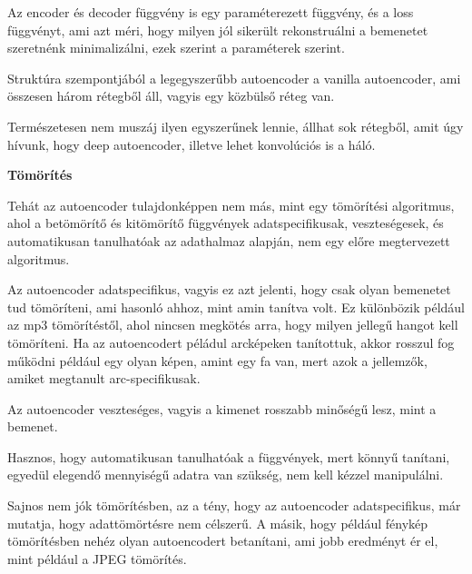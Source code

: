 \documentclass[12pt]{amsart}
\begin{document}
Az encoder és decoder függvény is egy paraméterezett
függvény, és a loss függvényt, ami azt méri, hogy milyen jól
sikerült rekonstruálni a bemenetet szeretnénk minimalizálni,
ezek szerint a paraméterek szerint. 

\vspace{5pt}

Struktúra szempontjából a legegyszerűbb autoencoder a
vanilla autoencoder, ami összesen három rétegből áll, vagyis
egy közbülső réteg van.

\vspace{5pt}

Természetesen nem muszáj ilyen egyszerűnek lennie, állhat
sok rétegből, amit úgy hívunk, hogy deep autoencoder,
illetve lehet konvolúciós is a háló. 

\vspace{10pt}

\textbf{Tömörítés}

\vspace{10pt}

Tehát az autoencoder tulajdonképpen nem más, mint egy
tömörítési algoritmus, ahol a betömörítő és kitömörítő
függvények adatspecifikusak, veszteségesek, és automatikusan
tanulhatóak az adathalmaz alapján, nem egy előre
megtervezett algoritmus. 

\vspace{5pt}

Az autoencoder adatspecifikus, vagyis ez azt jelenti, hogy
csak olyan bemenetet tud tömöríteni, ami hasonló ahhoz, mint
amin tanítva volt. Ez különbözik például az mp3
tömörítéstől, ahol nincsen megkötés arra, hogy milyen
jellegű hangot kell tömöríteni. Ha az autoencodert péládul
arcképeken tanítottuk, akkor rosszul fog működni például egy
olyan képen, amint egy fa van, mert azok a jellemzők, amiket
megtanult arc-specifikusak. 

\vspace{5pt}

Az autoencoder veszteséges, vagyis a kimenet rosszabb
minőségű lesz, mint a bemenet.

\vspace{5pt}

Hasznos, hogy automatikusan tanulhatóak a függvények, mert
könnyű tanítani, egyedül elegendő mennyiségű adatra van
szükség, nem kell kézzel manipulálni. 

\vspace{5pt}

Sajnos nem jók tömörítésben, az a tény, hogy az autoencoder
adatspecifikus, már mutatja, hogy adattömörtésre nem
célszerű. A másik, hogy például fénykép tömörítésben nehéz
olyan autoencodert betanítani, ami jobb eredményt ér el,
mint például a JPEG tömörítés.
\end{document}
